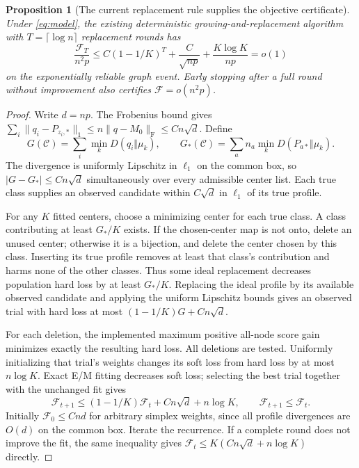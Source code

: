 \documentclass[11pt]{article}
\newtheorem{proposition}[theorem]{Proposition}
\newcommand{\F}{\mathrm F}
\begin{document}
\begin{proposition}[The current replacement rule supplies the objective certificate]\label{prop:certificate}
Under \eqref{eq:model}, the existing deterministic growing-and-replacement algorithm with $T=\lceil\log n\rceil$ replacement rounds has
\[
 \frac{\mathcal F_T}{n^2p}
 \le C(1-1/K)^T+\frac{C}{\sqrt{np}}+\frac{K\log K}{np}=o(1)
\]
on the exponentially reliable graph event. Early stopping after a full round without improvement also certifies $\mathcal F=o(n^2p)$.
\end{proposition}
\begin{proof}
Write $d=np$. The Frobenius bound gives $\sum_i\|q_i-P_{z_i,*}\|_1\le n\|q-M_0\|_\F\le Cn\sqrt d$. Define
\[
 G(\mathcal C)=\sum_i\min_kD(q_i\Vert\mu_k),\qquad
 G_*(\mathcal C)=\sum_an_a\min_kD(P_{a*}\Vert\mu_k).
\]
The divergence is uniformly Lipschitz in $\ell_1$ on the common box, so $|G-G_*|\le Cn\sqrt d$ simultaneously over every admissible center list. Each true class supplies an observed candidate within $C\sqrt d$ in $\ell_1$ of its true profile.

For any $K$ fitted centers, choose a minimizing center for each true class. A class contributing at least $G_*/K$ exists. If the chosen-center map is not onto, delete an unused center; otherwise it is a bijection, and delete the center chosen by this class. Inserting its true profile removes at least that class's contribution and harms none of the other classes. Thus some ideal replacement decreases population hard loss by at least $G_*/K$. Replacing the ideal profile by its available observed candidate and applying the uniform Lipschitz bounds gives an observed trial with hard loss at most $(1-1/K)G+Cn\sqrt d$.

For each deletion, the implemented maximum positive all-node score gain minimizes exactly the resulting hard loss. All deletions are tested. Uniformly initializing that trial's weights changes its soft loss from hard loss by at most $n\log K$. Exact E/M fitting decreases soft loss; selecting the best trial together with the unchanged fit gives
\[
 \mathcal F_{t+1}\le(1-1/K)\mathcal F_t+Cn\sqrt d+n\log K,
 \qquad \mathcal F_{t+1}\le\mathcal F_t.
\]
Initially $\mathcal F_0\le Cnd$ for arbitrary simplex weights, since all profile divergences are $O(d)$ on the common box. Iterate the recurrence. If a complete round does not improve the fit, the same inequality gives $\mathcal F_t\le K(Cn\sqrt d+n\log K)$ directly.
\end{proof}
\end{document}
